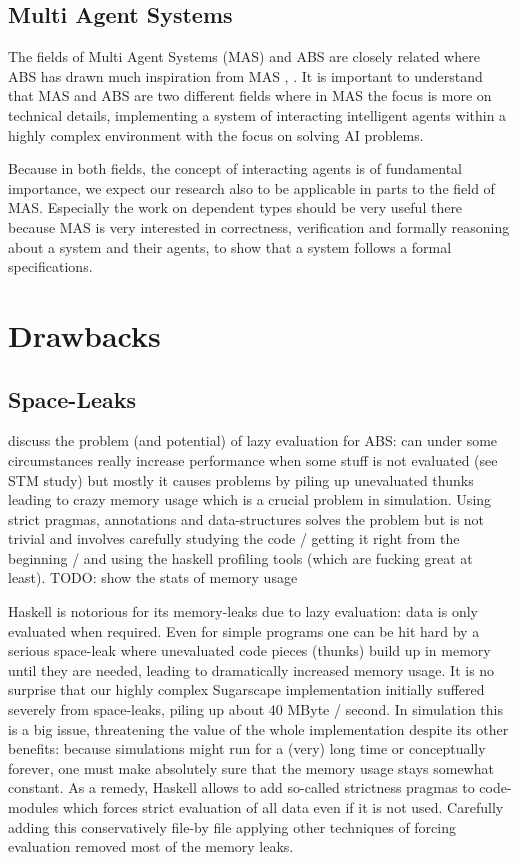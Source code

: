\subsection{Multi Agent Systems}
The fields of Multi Agent Systems (MAS) and ABS are closely related where ABS has drawn much inspiration from MAS \cite{wooldridge_introduction_2009}, \cite{weiss_multiagent_2013}. It is important to understand that MAS and ABS are two different fields where in MAS the focus is more on technical details, implementing a system of interacting intelligent agents within a highly complex environment with the focus on solving AI problems.

Because in both fields, the concept of interacting agents is of fundamental importance, we expect our research also to be applicable in parts to the field of MAS. Especially the work on dependent types should be very useful there because MAS is very interested in correctness, verification and formally reasoning about a system and their agents, to show that a system follows a formal specifications.

\section{Drawbacks}
\label{sec:drawbacks}

\subsection{Space-Leaks}
discuss the problem (and potential) of lazy evaluation for ABS: can under some circumstances really increase performance when some stuff is not evaluated (see STM study) but mostly it causes problems by piling up unevaluated thunks leading to crazy memory usage which is a crucial problem in simulation. Using strict pragmas, annotations and data-structures solves the problem but is not trivial and involves carefully studying the code / getting it right from the beginning / and using the haskell profiling tools (which are fucking great at least). TODO: show the stats of memory usage

Haskell is notorious for its memory-leaks due to lazy evaluation: data is only evaluated when required. Even for simple programs one can be hit hard by a serious space-leak where unevaluated code pieces (thunks) build up in memory until they are needed, leading to dramatically increased memory usage. It is no surprise that our highly complex Sugarscape implementation initially suffered severely from space-leaks, piling up about 40 MByte / second. In simulation this is a big issue, threatening the value of the whole implementation despite its other benefits: because simulations might run for a (very) long time or conceptually forever, one must make absolutely sure that the memory usage stays somewhat constant. As a remedy, Haskell allows to add so-called strictness pragmas to code-modules which forces strict evaluation of all data even if it is not used. Carefully adding this conservatively file-by file applying other techniques of forcing evaluation removed most of the memory leaks.

